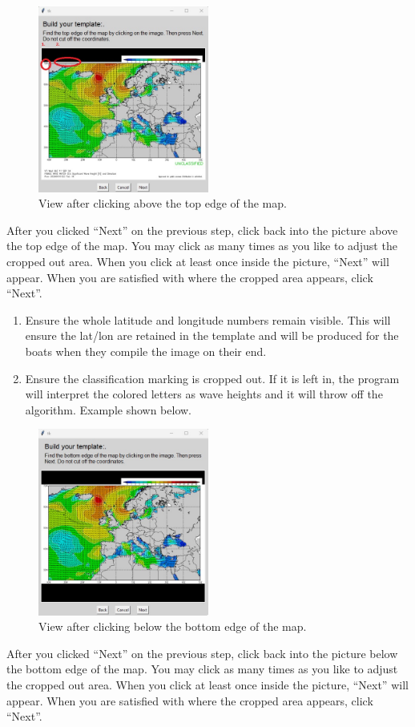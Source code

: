 \newpage
\begin{figure}[H]
    \centering\includegraphics[width=0.5\textwidth]{TeX/Build_Template4.jpg}
    \caption{View after clicking above the top edge of the map.}
\end{figure}
After you clicked ``Next'' on the previous step, click back into the picture above the top edge of the map. You may click as many times as you like to adjust the cropped out area. When you click at least once inside the picture, ``Next'' will appear. When you  are satisfied with where the cropped area appears, click ``Next''.
\begin{enumerate}
    \item Ensure the whole latitude and longitude numbers remain visible.  This will ensure the lat/lon are retained in the template and will be produced for the boats when they compile the image on their end.
    \item Ensure the classification marking is cropped out. If it is left in, the program will interpret the colored letters as wave heights and it will throw off the algorithm. Example shown below.
\end{enumerate}

\newpage
\begin{figure}[H]
    \centering\includegraphics[width=0.5\textwidth]{TeX/Build_Template5.jpg}
    \caption{View after clicking below the bottom edge of the map.}
\end{figure}
After you clicked ``Next'' on the previous step, click back into the picture below the bottom edge of the map. You may click as many times as you like to adjust the cropped out area. When you click at least once inside the picture, ``Next'' will appear. When you  are satisfied with where the cropped area appears, click ``Next''.

